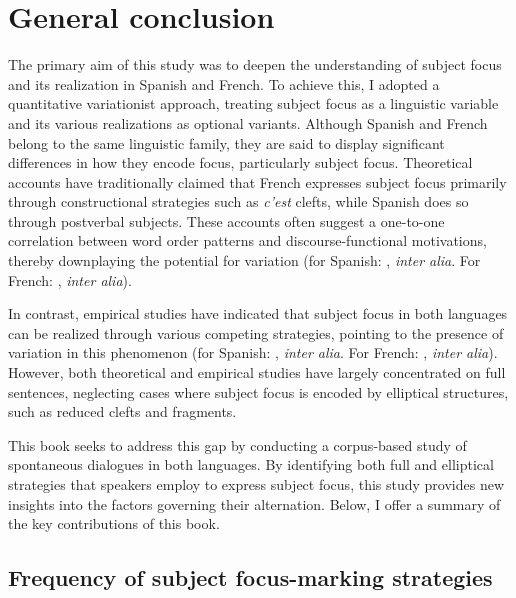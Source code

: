 \chapter{General conclusion}
The primary aim of this study was to deepen the understanding of subject focus and its realization in Spanish and French. To achieve this, I adopted a quantitative variationist approach, treating subject focus as a linguistic variable and its various realizations as optional variants. Although Spanish and French belong to the same linguistic family, they are said to display significant differences in how they encode focus, particularly subject focus. Theoretical accounts have traditionally claimed that French expresses subject focus primarily through constructional strategies such as \textit{c'est} clefts, while Spanish does so through postverbal subjects. These accounts often suggest a one-to-one correlation between word order patterns and discourse-functional motivations, thereby downplaying the potential for variation (for Spanish: \cite{zubizarreta1998prosody, costa2001postverbal, samek2001crosslinguistic, gutierrez2013structural}, \textit{inter alia}. For French: \cite{prince1978comparison, lambrecht1996information, belletti2005answering}, \textit{inter alia}).

In contrast, empirical studies have indicated that subject focus in both languages can be realized through various competing strategies, pointing to the presence of variation in this phenomenon (for Spanish: \cite{gabriel2007fokus, gabriel2010focus, heidinger2013information, uth2014spanish, cabrera1999funciones, feldhausen2015oraciones}, \textit{inter alia}. For French: \cite{dufter2009focus, fery2001focus, choi2005gens, lahousse2006, Lahousse2011, karssenberg2017oiseaux, Karssenberg2018}, \textit{inter alia}). However, both theoretical and empirical studies have largely concentrated on full sentences, neglecting cases where subject focus is encoded by elliptical structures, such as reduced clefts and fragments.

This book seeks to address this gap by conducting a corpus-based study of spontaneous dialogues in both languages. By identifying both full and elliptical strategies that speakers employ to express subject focus, this study provides new insights into the factors governing their alternation. Below, I offer a summary of the key contributions of this book.

\section{Frequency of subject focus-marking strategies} %


